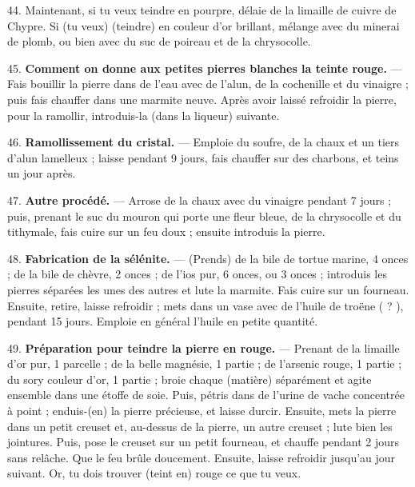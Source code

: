 \documentclass[a4paper, 11pt, oneside, polutonikogreek, french]{article}
\begin{document}
44. Maintenant, si tu veux teindre en pourpre, délaie de la limaille de cuivre de Chypre. Si (tu veux) (teindre) en couleur d'or brillant, mélange avec du minerai de plomb, ou bien avec du suc de poireau et de la chrysocolle.

45. \textbf{Comment on donne aux petites pierres blanches la teinte rouge.} --- Fais bouillir la pierre dans de l'eau avec de l'alun, de la cochenille et du vinaigre ; puis fais chauffer dans une marmite neuve. Après avoir laissé refroidir la pierre, pour la ramollir, introduis-la (dans la liqueur) suivante.

46. \textbf{Ramollissement du cristal.} --- Emploie du soufre, de la chaux et un tiers d'alun lamelleux ; laisse pendant 9 jours, fais chauffer sur des charbons, et teins un jour après.

47. \textbf{Autre procédé.} --- Arrose de la chaux avec du vinaigre pendant 7 jours ; puis, prenant le suc du mouron qui porte une fleur bleue, de la chrysocolle et du tithymale, fais cuire sur un feu doux ; ensuite introduis la pierre.

48. \textbf{Fabrication de la sélénite.} --- (Prends) de la bile de tortue marine, 4 onces ; de la bile de chèvre, 2 onces ; de l'ios pur, 6 onces, ou 3 onces ; introduis les pierres séparées les unes des autres et lute la marmite. Fais cuire sur un fourneau. Ensuite, retire, laisse refroidir ; mets dans un vase avec de l'huile de troëne ( ? ), pendant 15 jours. Emploie en général l'huile en petite quantité.

49. \textbf{Préparation pour teindre la pierre en rouge.} --- Prenant de la limaille d'or pur, 1 parcelle ; de la belle magnésie, 1 partie ; de l'arsenic rouge, 1 partie ; du sory couleur d'or, 1 partie ; broie chaque (matière) séparément et agite ensemble dans une étoffe de soie. Puis, pétris dans de l'urine de vache concentrée à point ; enduis-(en) la pierre précieuse, et laisse durcir. Ensuite, mets la pierre dans un petit creuset et, au-dessus de la pierre, un autre creuset ; lute bien les jointures. Puis, pose le creuset sur un petit fourneau, et chauffe pendant 2 jours sans relâche. Que le feu brûle doucement. Ensuite, laisse refroidir jusqu'au jour suivant. Or, tu dois trouver (teint en) rouge ce que tu veux.

\bigskip
\centerline{\EightStarTaper}
\centerline{\EightStarTaper\EightStarTaper}
\bigskip
\end{document}
